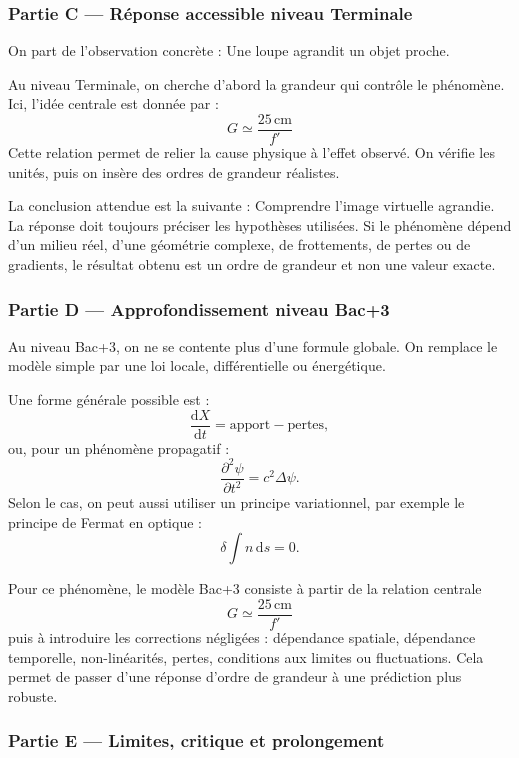 \documentclass[11pt,a4paper]{article}
\begin{document}
\subsubsection*{Partie C — Réponse accessible niveau Terminale}

\begin{corrigebox}
On part de l'observation concrète : Une loupe agrandit un objet proche.

Au niveau Terminale, on cherche d'abord la grandeur qui contrôle le phénomène. Ici, l'idée centrale est donnée par :
\[
G\simeq\frac{25\,\mathrm{cm}}{f'}
\]
Cette relation permet de relier la cause physique à l'effet observé. On vérifie les unités, puis on insère des ordres de grandeur réalistes.

La conclusion attendue est la suivante : Comprendre l'image virtuelle agrandie. La réponse doit toujours préciser les hypothèses utilisées. Si le phénomène dépend d'un milieu réel, d'une géométrie complexe, de frottements, de pertes ou de gradients, le résultat obtenu est un ordre de grandeur et non une valeur exacte.
\end{corrigebox}

\subsubsection*{Partie D — Approfondissement niveau Bac+3}

\begin{approfondissementbox}
Au niveau Bac+3, on ne se contente plus d'une formule globale. On remplace le modèle simple par une loi locale, différentielle ou énergétique.

Une forme générale possible est :
\[
\frac{\mathrm d X}{\mathrm dt}=\text{apport}-\text{pertes},
\]
ou, pour un phénomène propagatif :
\[
\frac{\partial^2 \psi}{\partial t^2}=c^2\Delta\psi.
\]
Selon le cas, on peut aussi utiliser un principe variationnel, par exemple le principe de Fermat en optique :
\[
\delta \int n\,\mathrm ds=0.
\]

Pour ce phénomène, le modèle Bac+3 consiste à partir de la relation centrale
\[
G\simeq\frac{25\,\mathrm{cm}}{f'}
\]
puis à introduire les corrections négligées : dépendance spatiale, dépendance temporelle, non-linéarités, pertes, conditions aux limites ou fluctuations. Cela permet de passer d'une réponse d'ordre de grandeur à une prédiction plus robuste.
\end{approfondissementbox}

\subsubsection*{Partie E — Limites, critique et prolongement}
\end{document}
